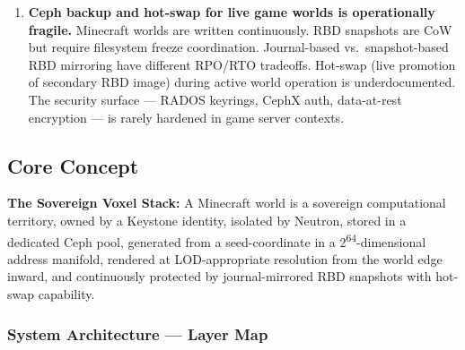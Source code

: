 \documentclass[11pt,letterpaper]{article}
\begin{document}
\begin{enumerate}
  \item \textbf{Ceph backup and hot-swap for live game worlds is operationally fragile.} Minecraft worlds are written continuously. RBD snapshots are CoW but require filesystem freeze coordination. Journal-based vs.\ snapshot-based RBD mirroring have different RPO/RTO tradeoffs. Hot-swap (live promotion of secondary RBD image) during active world operation is underdocumented. The security surface --- RADOS keyrings, CephX auth, data-at-rest encryption --- is rarely hardened in game server contexts.
\end{enumerate}

\subsection{Core Concept}

\textbf{The Sovereign Voxel Stack:} A Minecraft world is a sovereign computational territory, owned by a Keystone identity, isolated by Neutron, stored in a dedicated Ceph pool, generated from a seed-coordinate in a 2\textsuperscript{64}-dimensional address manifold, rendered at LOD-appropriate resolution from the world edge inward, and continuously protected by journal-mirrored RBD snapshots with hot-swap capability.

\subsubsection{System Architecture --- Layer Map}
\end{document}
